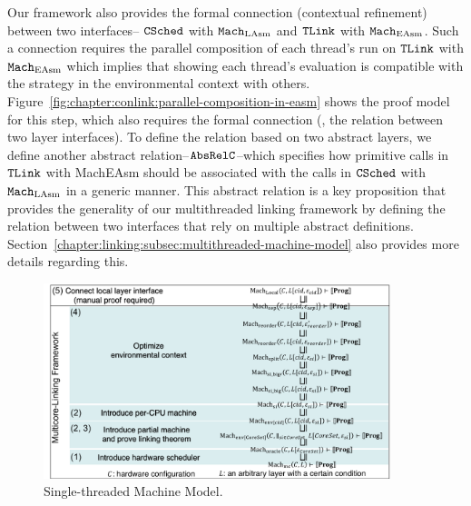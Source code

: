 Our framework also provides the formal connection (contextual refinement) between two interfaces--
${{\mathrm{\texttt{CSched}}}}$ with ${\mathrm{\texttt{Mach}}}_{\mathrm{LAsm}}$ and ${{\mathrm{\texttt{TLink}}}}$ with ${\mathrm{\texttt{Mach}}}_{\mathrm{EAsm}}$.
Such a connection requires the parallel composition of each thread’s run on ${{\mathrm{\texttt{TLink}}}}$ with ${\mathrm{\texttt{Mach}}}_{\mathrm{EAsm}}$ which implies that showing each thread’s evaluation is compatible with the strategy in the environmental context with others. 
Figure~\ref{fig:chapter:conlink:parallel-composition-in-easm}  shows the proof model for this step, which also requires the formal connection 
(\ie, the relation between two layer interfaces). 
To define the relation based on two abstract layers, we define another abstract relation--${{\mathrm{\texttt{AbsRelC}}}}$--which specifies how primitive calls in ${{\mathrm{\texttt{TLink}}}}$ with MachEAsm should be associated with the calls in ${{\mathrm{\texttt{CSched}}}}$ with ${\mathrm{\texttt{Mach}}}_{\mathrm{LAsm}}$ in a generic manner. 
This abstract relation is a key proposition that provides the generality of our multithreaded linking framework by defining the relation between two interfaces that rely on multiple abstract definitions. 
Section~\ref{chapter:linking:subsec:multithreaded-machine-model} also provides more details regarding this.


\begin{figure}
\begin{center}
\includegraphics[width=0.9\textwidth, page=7]{figs/conlink/concurrent_linking}
\end{center}
\caption{Single-threaded Machine Model.}
\label{fig:chapter:conlink:introduce-single-threaded-machine-model-with-iiasm}
\end{figure}


